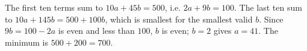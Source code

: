 The first ten terms sum to $10a+45b=500$, i.e. $2a+9b=100$. The last ten sum to $10a+145b=500+100b$, which is smallest for the smallest valid $b$. Since $9b=100-2a$ is even and less than $100$, $b$ is even; $b=2$ gives $a=41$. The minimum is $500+200=\boxed{700}$.
